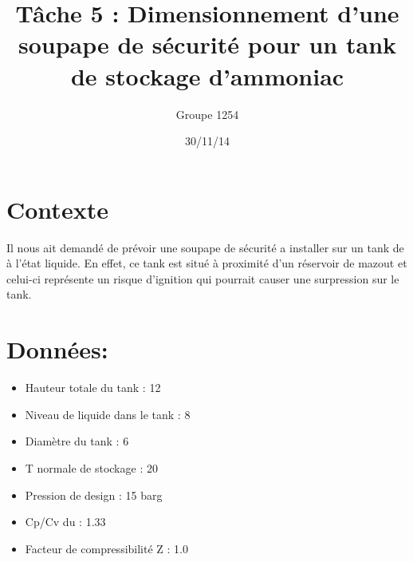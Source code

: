\documentclass{report}
\title{\textbf{Tâche 5 : Dimensionnement d'une soupape de sécurité pour un tank de stockage d'ammoniac}}
\author{Groupe 1254}
\date{30/11/14}
\begin{document}
\maketitle
\section*{Contexte}
Il nous ait demandé de prévoir une soupape de sécurité a installer sur un tank de  à l'état liquide. En effet, ce tank est situé à proximité d'un réservoir de mazout et celui-ci représente un risque d'ignition qui pourrait causer une surpression sur le tank. 
\section*{\large{Données:}}
\begin{itemize}
\item Hauteur totale du tank : 12\meter
\item Niveau de  liquide dans le tank : 8\meter
\item Diamètre du tank : 6\meter
\item T normale de stockage : 20\celsius
\item Pression de design : 15 barg
\item Cp/Cv du  : 1.33
\item Facteur de compressibilité Z : 1.0
\end{itemize}
\end{document}
